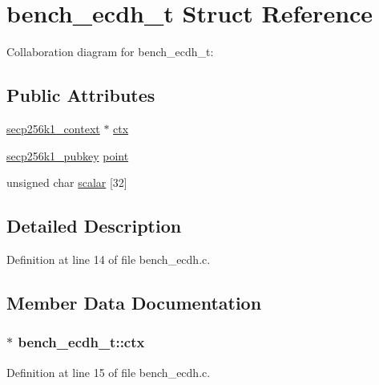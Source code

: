 \hypertarget{structbench__ecdh__t}{}\section{bench\+\_\+ecdh\+\_\+t Struct Reference}
\label{structbench__ecdh__t}


Collaboration diagram for bench\+\_\+ecdh\+\_\+t\+:
\subsection*{Public Attributes}
\begin{DoxyCompactItemize}
\item 
\hyperlink{secp256k1_8h_a282ec9e6dfec8c35955c3eb2f7476e5e}{secp256k1\+\_\+context} $\ast$ \hyperlink{structbench__ecdh__t_a1e080318ae111032a3068748e2a50a57}{ctx}
\item 
\hyperlink{structsecp256k1__pubkey}{secp256k1\+\_\+pubkey} \hyperlink{structbench__ecdh__t_aa2d9806cee2be627fc76ce1bca9dd5e8}{point}
\item 
unsigned char \hyperlink{structbench__ecdh__t_a2641f51e954a515683720afab29009c4}{scalar} \mbox{[}32\mbox{]}
\end{DoxyCompactItemize}


\subsection{Detailed Description}


Definition at line 14 of file bench\+\_\+ecdh.\+c.



\subsection{Member Data Documentation}
\hypertarget{structbench__ecdh__t_a1e080318ae111032a3068748e2a50a57}{}
\subsubsection[{ctx}]{$\ast$ bench\+\_\+ecdh\+\_\+t\+::ctx}\label{structbench__ecdh__t_a1e080318ae111032a3068748e2a50a57}


Definition at line 15 of file bench\+\_\+ecdh.\+c.

\hypertarget{structbench__ecdh__t_aa2d9806cee2be627fc76ce1bca9dd5e8}{}
